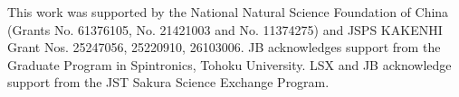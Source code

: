 \documentclass[aps,pre,reprint,superscriptaddress,longbibliography]{revtex4-1}
\begin{document}
\begin{acknowledgments}
This work was supported by the National Natural Science Foundation
of China (Grants No. 61376105, No. 21421003 and No. 11374275) and JSPS KAKENHI Grant Nos. 25247056, 25220910, 26103006. JB acknowledges support from the Graduate Program in Spintronics, Tohoku University. LSX and JB acknowledge support from the JST Sakura Science Exchange Program.

\end{acknowledgments}


%

\end{document}
